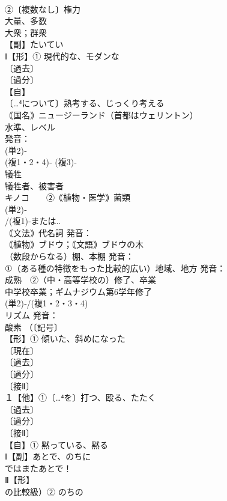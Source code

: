 \documentclass[8pt]{extreport}
\begin{document}
\begin{CJK}{UTF8}{min}
\\	②〔複数なし〕権力
\\	大量、多数 
\\	大衆；群衆
\\	【副】たいてい 
\\	Ⅰ【形】① 現代的な、モダンな 
\\	〔過去〕
\\	〔過分〕
\\	【自】
\\	〔…⁴について〕熟考する、じっくり考える
\\	｟国名｠ニュージーランド（首都はウェリントン）
\\	水準、レベル 
\\	発音：
\\	(単2)‐
\\	(複1・2・4)‐ (複3)‐
\\	犠牲 
\\	犠牲者、被害者
\\	キノコ　　②｟植物・医学｠菌類
\\	(単2)‐
\\	/(複1)‐または..
\\	｟文法｠代名詞 発音：
\\	｟植物｠ブドウ；｟文語｠ブドウの木
\\	（数段からなる）棚、本棚 発音：
\\	①（ある種の特徴をもった比較的広い）地域、地方 発音：
\\	成熟　②（中・高等学校の）修了、卒業　
\\	中学校卒業；ギムナジウム第6学年修了
\\	(単2)‐/(複1・2・3・4)
\\	リズム 発音：
\\	酸素 （〔記号〕
\\	【形】① 傾いた、斜めになった
\\	〔現在〕
\\	〔過去〕
\\	〔過分〕
\\	〔接Ⅱ〕
\\	１【他】①〔…⁴を〕打つ、殴る、たたく 
\\	〔過去〕
\\	〔過分〕
\\	〔接Ⅱ〕
\\	【自】① 黙っている、黙る
\\	Ⅰ【副】あとで、のちに 
\\	ではまたあとで！
\\	Ⅱ【形】
\\	の比較級）② のちの

\end{CJK}
\end{document}
